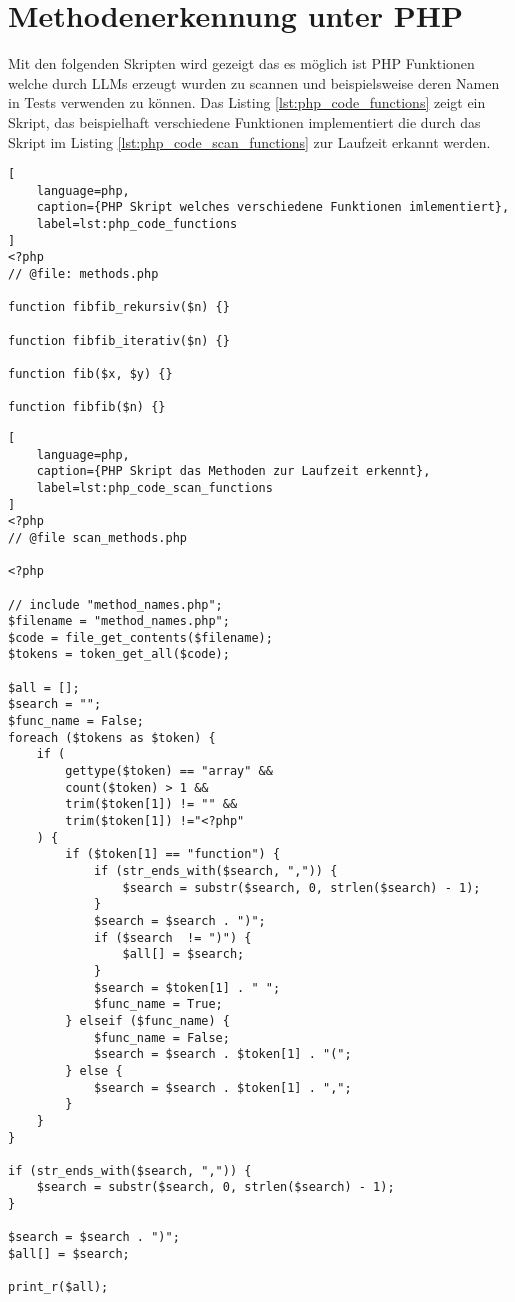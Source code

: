 


\newpage
\section{Methodenerkennung unter PHP}
Mit den folgenden Skripten wird gezeigt das es möglich ist PHP Funktionen welche durch LLMs erzeugt wurden zu scannen und beispielsweise deren Namen in Tests verwenden zu können. Das Listing \ref{lst:php_code_functions} zeigt ein Skript, das beispielhaft verschiedene Funktionen implementiert die durch das Skript im Listing \ref{lst:php_code_scan_functions} zur Laufzeit erkannt werden.\vspace{0.2cm}

\begin{lstlisting}[
	language=php,
	caption={PHP Skript welches verschiedene Funktionen imlementiert},
	label=lst:php_code_functions
]
<?php
// @file: methods.php

function fibfib_rekursiv($n) {}

function fibfib_iterativ($n) {}

function fib($x, $y) {}

function fibfib($n) {}

\end{lstlisting}

\begin{lstlisting}[
	language=php,
	caption={PHP Skript das Methoden zur Laufzeit erkennt},
	label=lst:php_code_scan_functions
]
<?php
// @file scan_methods.php

<?php

// include "method_names.php";
$filename = "method_names.php";
$code = file_get_contents($filename);
$tokens = token_get_all($code);

$all = [];
$search = "";
$func_name = False;
foreach ($tokens as $token) {
	if (
		gettype($token) == "array" &&
		count($token) > 1 &&
		trim($token[1]) != "" &&
		trim($token[1]) !="<?php"
	) {
		if ($token[1] == "function") {
			if (str_ends_with($search, ",")) {
				$search = substr($search, 0, strlen($search) - 1);
			}
			$search = $search . ")";
			if ($search  != ")") {
				$all[] = $search;
			}
			$search = $token[1] . " ";
			$func_name = True;
		} elseif ($func_name) {
			$func_name = False;
			$search = $search . $token[1] . "(";
		} else {
			$search = $search . $token[1] . ",";
		}
	}
}

if (str_ends_with($search, ",")) {
	$search = substr($search, 0, strlen($search) - 1);
}

$search = $search . ")";
$all[] = $search;

print_r($all);
\end{lstlisting}

